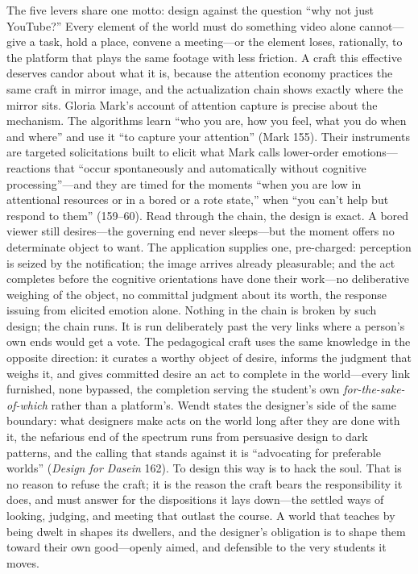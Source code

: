 The five levers share one motto: design against the question ``why not
just YouTube?'' Every element of the world must do something video
alone cannot---give a task, hold a place, convene a meeting---or the
element loses, rationally, to the platform that plays the same footage
with less friction. A craft this effective deserves candor about what it
is, because the attention economy practices the same craft in mirror
image, and the actualization chain shows exactly where the mirror
sits. Gloria Mark's account of attention capture is precise about the
mechanism. The algorithms learn ``who you are, how you feel, what you
do when and where'' and use it ``to capture your attention'' (Mark
155). Their instruments are targeted solicitations built to elicit
what Mark calls lower-order emotions---reactions that ``occur
spontaneously and automatically without cognitive processing''---and
they are timed for the moments ``when you are low in attentional
resources or in a bored or a rote state,'' when ``you can't help but
respond to them'' (159--60). Read through the chain, the design is
exact. A bored viewer still desires---the governing end never
sleeps---but the moment offers no determinate object to want. The
application supplies one, pre-charged: perception is seized by the
notification; the image arrives already pleasurable; and the act
completes before the cognitive orientations have done their
work---no deliberative weighing of the object, no committal judgment
about its worth, the response issuing from elicited emotion alone.
Nothing in the chain is broken by such design; the chain runs. It is
run deliberately past the very links where a person's own ends would
get a vote. The pedagogical craft uses the same knowledge in the
opposite direction: it curates a worthy object of desire, informs the
judgment that weighs it, and gives committed desire an act to complete
in the world---every link furnished, none bypassed, the completion
serving the student's own \textit{for-the-sake-of-which} rather than a
platform's. Wendt states the designer's side of the same boundary:
what designers make acts on the world long after they are done with
it, the nefarious end of the spectrum runs from persuasive design to
dark patterns, and the calling that stands against it is
``advocating for preferable worlds'' (\textit{Design for Dasein} 162).
To design this way is to hack the soul. That is no reason to refuse
the craft; it is the reason the craft bears the responsibility it
does, and must answer for the dispositions it lays down---the settled
ways of looking, judging, and meeting that outlast the course. A world
that teaches by being dwelt in shapes its dwellers, and the designer's
obligation is to shape them toward their own good---openly aimed, and
defensible to the very students it moves.

